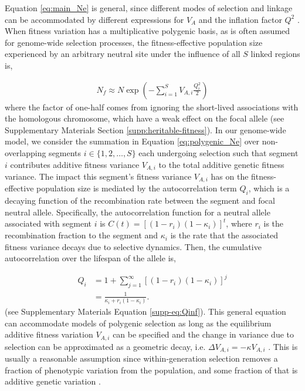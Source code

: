 \documentclass[11pt]{article}
\begin{document}
Equation \eqref{eq:main_Ne} is general, since different modes of selection and
linkage can be accommodated by different expressions for $V_A$ and the
inflation factor $Q^2$ \parencite{Santiago1995-hx,Santiago1998-bs}. When
fitness variation has a multiplicative polygenic basis, as is often assumed for
genome-wide selection processes, the fitness-effective
population size experienced by an arbitrary neutral site under the influence of
all $S$ linked regions is,

\begin{align}
    \label{eq:polygenic_Ne}
    N_f \approx N \exp\left(-\sum_{i=1}^S V_{A,i} \frac{Q_i^2}{2}\right)
\end{align}
%
where the factor of one-half comes from ignoring the short-lived 
associations with the homologous chromosome, 
which have a weak effect on the focal allele (see Supplementary Materials Section
\ref{supp:heritable-fitness}). In our genome-wide model, we consider the
summation in Equation \eqref{eq:polygenic_Ne} over non-overlapping segments $i
\in \{1, 2, \ldots, S\}$ each undergoing selection such that segment $i$
contributes additive fitness variance $V_{A,i}$ to the total additive genetic
fitness variance. The impact this segment's fitness variance $V_{A,i}$ has on 
the fitness-effective population size is mediated by the autocorrelation term 
$Q_i$, which is a decaying function of the recombination rate between the 
segment and focal neutral allele. Specifically, the autocorrelation function
for a neutral allele associated with segment $i$ is $C(t) = [(1-r_i)(1-\kappa_i)]^t$, 
where $r_i$ is the recombination fraction to the segment and $\kappa_i$ is the rate that the
associated fitness variance decays due to selective dynamics. Then, the
cumulative autocorrelation over the lifespan of the allele is,

\begin{align}
    \label{eq:Q}
    Q_i &= 1 + \sum_{j=1}^\infty \left[(1-r_i)(1-\kappa_i)\right]^j \nonumber \\
        &= \frac{1}{\kappa_i + r_i(1-\kappa_i)}.
\end{align}
%
(see Supplementary Materials Equation \ref{supp-eq:Qinf}). This general equation can accommodate models of polygenic selection as long as the equilibrium additive fitness variation $V_{A,i}$ can be specified and the change in variance due to selection can be approximated as a geometric decay, i.e. $\Delta V_{A,i} = -\kappa V_{A,i}$ \parencite{Bulmer1971-ae,Keightley1988-eq,Walsh2018-bt, Santiago1998-bs}. This is usually a reasonable assumption since within-generation selection removes a fraction of phenotypic variation from the population, and some fraction of that is additive genetic variation \parencite{Bulmer1971-ae,Keightley1988-eq}.
\end{document}
